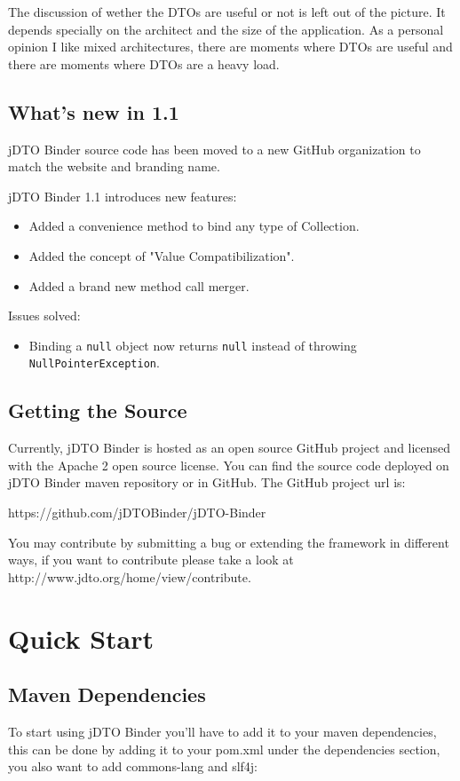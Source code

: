 \documentclass[11pt]{article}
\newcommand{\JDTO}{jDTO Binder\xspace}
\newcommand{\JDV}{1.1\xspace}
\begin{document}
The discussion of wether the DTOs are useful or not is left out of the picture. It depends specially on 
the architect and the size of the application. As a personal opinion I like mixed architectures, there are
moments where DTOs are useful and there are moments where DTOs are a heavy load.

\subsection{What's new in \JDV}

\JDTO source code has been moved to a new GitHub organization to match the website and branding name.

\JDTO \JDV introduces new features:
\begin{itemize}
\item Added a convenience method to bind any type of Collection.
\item Added the concept of "Value Compatibilization".
\item Added a brand new method call merger.
\end{itemize}

Issues solved:

\begin{itemize}
\item Binding a \texttt{null} object now returns \texttt{null} instead of throwing \texttt{NullPointerException}.
\end{itemize}

\subsection{Getting the Source}

Currently, \JDTO is hosted as an open source GitHub project and licensed with the Apache 2 open source license. You can find the source code deployed on \JDTO maven repository or in GitHub. The GitHub project url is: 

https://github.com/jDTOBinder/jDTO-Binder

You may contribute by submitting a bug or extending the framework in different ways, if you want to contribute please take a look at http://www.jdto.org/home/view/contribute.

\section{Quick Start}


\subsection{Maven Dependencies}
To start using \JDTO you'll have to add it to your maven dependencies, this can be done
by adding it to your pom.xml under the dependencies section, you also want to add commons-lang and slf4j:
\end{document}
